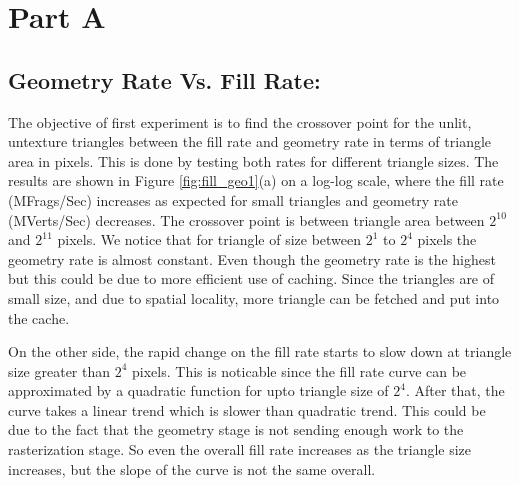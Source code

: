 \section{Part A}
\subsection{Geometry Rate Vs. Fill Rate:}
The objective of first experiment is to find the crossover point for the unlit, untexture triangles between the fill rate and geometry rate in terms of triangle area in pixels.  This is done by testing both rates for different triangle sizes. The results are shown in Figure \ref{fig:fill_geo1}(a) on a log-log scale, where the fill rate (MFrags/Sec) increases as expected for small triangles and geometry rate (MVerts/Sec) decreases. The crossover point is between triangle area between $2^{10}$ and $2^{11}$ pixels. We notice that for triangle of size between $2^{1}$ to $2^{4}$ pixels the geometry rate is almost constant.  Even though the geometry rate is the highest but this could be due to more efficient use of caching. Since the triangles are of small size, and due to spatial locality, more triangle can be fetched and put into the cache. 

On the other side, the rapid change on the fill rate starts to slow down at triangle size greater than $2^{4}$ pixels. This is noticable since the fill rate curve can be approximated by a quadratic function for upto triangle size of $2^{4}$. After that, the curve takes a linear trend which is slower than quadratic trend. This could be due to the fact that the geometry stage is not sending enough work to the rasterization stage. So even the overall fill rate increases as the triangle size increases, but the slope of the curve is not the same overall.

